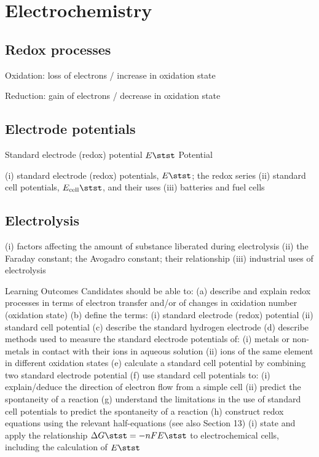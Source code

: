 \section{Electrochemistry}
\subsection{Redox processes}
Oxidation: loss of electrons / increase in oxidation state

Reduction: gain of electrons / decrease in oxidation state

\subsection{Electrode potentials}
\begin{defn}{Standard electrode (redox) potential $E\stst$}{}
Potential 
\end{defn}
(i) standard electrode (redox) potentials, $E\stst$; the redox series
(ii) standard cell potentials, $E_\text{cell}\stst$, and their uses
(iii) batteries and fuel cells

\subsection{Electrolysis}
(i) factors affecting the amount of substance liberated during electrolysis
(ii) the Faraday constant; the Avogadro constant; their relationship
(iii) industrial uses of electrolysis

Learning Outcomes
Candidates should be able to:
(a) describe and explain redox processes in terms of electron transfer and/or of changes in oxidation number
(oxidation state)
(b) define the terms:
(i) standard electrode (redox) potential
(ii) standard cell potential
(c) describe the standard hydrogen electrode
(d) describe methods used to measure the standard electrode potentials of:
(i) metals or non-metals in contact with their ions in aqueous solution
(ii) ions of the same element in different oxidation states
(e) calculate a standard cell potential by combining two standard electrode potential
(f) use standard cell potentials to:
(i) explain/deduce the direction of electron flow from a simple cell
(ii) predict the spontaneity of a reaction
(g) understand the limitations in the use of standard cell potentials to predict the spontaneity of a reaction
(h) construct redox equations using the relevant half-equations (see also Section 13)
(i) state and apply the relationship $\Delta G\stst=-nFE\stst$ to electrochemical cells, including the calculation of $E\stst$

